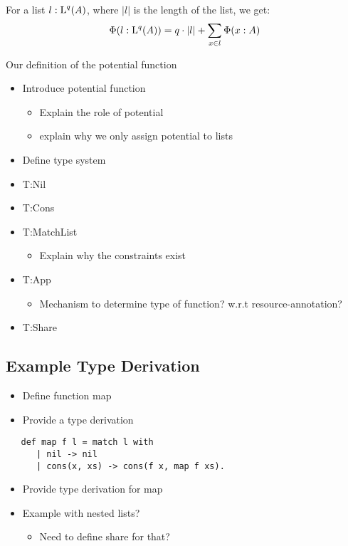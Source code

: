 \begin{corollary}
   For a list \(l : \text{L}^{q}(A)\), where \(|l|\) is the length of the list, we get:
   \[
      \Phi(l : \text{L}^{q}(A)) = q \cdot |l| + \sum_{x \in l} \Phi(x : A)
   \]
\end{corollary}

Our definition of the potential function 


\begin{itemize}
   \item Introduce potential function
      \begin{itemize}
         \item Explain the role of potential
         \item explain why we only assign potential to lists
      \end{itemize}
   \item Define type system
   \item T:Nil
   \item T:Cons
   \item T:MatchList
      \begin{itemize}
         \item Explain why the constraints exist
      \end{itemize}
   \item T:App
      \begin{itemize}
         \item Mechanism to determine type of function? w.r.t resource-annotation?
      \end{itemize}
   \item T:Share
\end{itemize}

\subsection{Example Type Derivation}
\begin{itemize}
   \item Define function map
   \item Provide a type derivation
\end{itemize}

\begin{verbatim}
   def map f l = match l with 
      | nil -> nil
      | cons(x, xs) -> cons(f x, map f xs).
\end{verbatim}

\begin{itemize}
   \item Provide type derivation for map
   \item Example with nested lists?
      \begin{itemize}
         \item Need to define share for that?
      \end{itemize}
\end{itemize}

